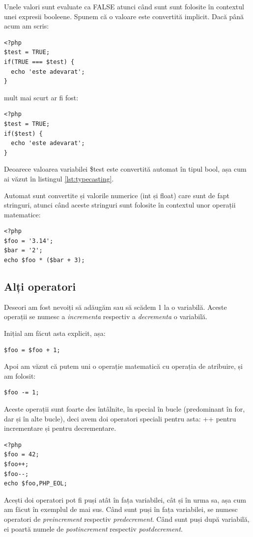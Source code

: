 Unele valori sunt evaluate ca FALSE atunci când sunt sunt folosite în
contextul unei expresii booleene. Spunem că o valoare este convertită
implicit. Dacă până acum am scris:
\begin{lstlisting}
<?php
$test = TRUE;
if(TRUE === $test) {
  echo 'este adevarat';
}
\end{lstlisting}
mult mai scurt ar fi fost:
\begin{lstlisting}
<?php
$test = TRUE;
if($test) {
  echo 'este adevarat';
}
\end{lstlisting}
Deoarece valoarea variabilei \$test este convertită automat în tipul bool, așa cum ai văzut
în listingul \ref{lst:typecasting}.

Automat sunt convertite și valorile numerice (int și float) care sunt de fapt stringuri, atunci
când aceste stringuri sunt folosite în contextul unor operații matematice:
\begin{lstlisting}
<?php
$foo = '3.14';
$bar = '2';
echo $foo * ($bar + 3);
\end{lstlisting}


\subsection{Alți operatori}
Deseori am fost nevoiți să adăugăm sau să scădem 1 la o variabilă. Aceste operații
se numesc a \textsl{incrementa} respectiv a \textsl{decrementa} o variabilă.

Inițial am făcut asta explicit, așa:
\begin{lstlisting}
$foo = $foo + 1;
\end{lstlisting}
Apoi am văzut că putem uni o operație matematică cu operația de atribuire, și am folosit:
\begin{lstlisting}
$foo -= 1;
\end{lstlisting}
Aceste operații sunt foarte des întâlnite, în special în bucle (predominant în for, dar și
în alte bucle), deci avem doi operatori speciali pentru asta: ++ pentru incrementare și
\verb --  pentru decrementare.
\begin{lstlisting}
<?php
$foo = 42;
$foo++;
$foo--;
echo $foo,PHP_EOL;
\end{lstlisting}

Acești doi operatori pot fi puși atât în fața variabilei, cât și în urma sa, așa
cum am făcut în exemplul de mai sus. Când sunt puși în fața variabilei, se numesc
operatori de \textsl{preincrement} respectiv \textsl{predecrement}. Când sunt puși
după variabilă, ei poartă numele de \textsl{postincrement} respectiv \textsl{postdecrement}.

